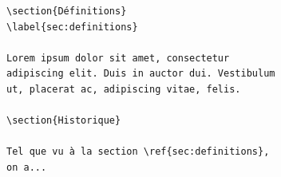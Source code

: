 \begin{frame}[plain,fragile=singleslide]
  \begin{lstlisting}[emph={\label,\ref}]
\section{Définitions}
\label{sec:definitions}

Lorem ipsum dolor sit amet, consectetur
adipiscing elit. Duis in auctor dui. Vestibulum
ut, placerat ac, adipiscing vitae, felis.

\section{Historique}

Tel que vu à la section \ref{sec:definitions},
on a...
\end{lstlisting}
\end{frame}
\begin{frame}[plain,fragile=singleslide]
\end{frame}

